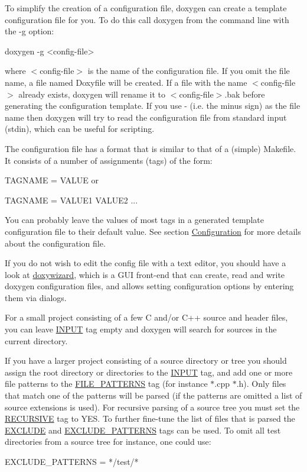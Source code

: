 To simplify the creation of a configuration file, doxygen can create a template configuration file for you. To do this call {\ttfamily doxygen} from the command line with the {\ttfamily -\/g} option: \begin{DoxyVerb}
doxygen -g <config-file>
\end{DoxyVerb}


where $<$config-\/file$>$ is the name of the configuration file. If you omit the file name, a file named {\ttfamily Doxyfile} will be created. If a file with the name $<$config-\/file$>$ already exists, doxygen will rename it to $<$config-\/file$>$.bak before generating the configuration template. If you use {\ttfamily -\/} (i.e. the minus sign) as the file name then doxygen will try to read the configuration file from standard input ({\ttfamily stdin}), which can be useful for scripting.

The configuration file has a format that is similar to that of a (simple) Makefile. It consists of a number of assignments (tags) of the form:

{\ttfamily TAGNAME = VALUE} or \par
 {\ttfamily TAGNAME = VALUE1 VALUE2 ... }\par


You can probably leave the values of most tags in a generated template configuration file to their default value. See section \hyperlink{config}{Configuration} for more details about the configuration file.

If you do not wish to edit the config file with a text editor, you should have a look at \hyperlink{doxywizard_usage}{doxywizard}, which is a GUI front-\/end that can create, read and write doxygen configuration files, and allows setting configuration options by entering them via dialogs.

For a small project consisting of a few C and/or C++ source and header files, you can leave \hyperlink{config_cfg_input}{INPUT} tag empty and doxygen will search for sources in the current directory.

If you have a larger project consisting of a source directory or tree you should assign the root directory or directories to the \hyperlink{config_cfg_input}{INPUT} tag, and add one or more file patterns to the \hyperlink{config_cfg_file_patterns}{FILE\_\-PATTERNS} tag (for instance {\ttfamily $\ast$.cpp $\ast$.h}). Only files that match one of the patterns will be parsed (if the patterns are omitted a list of source extensions is used). For recursive parsing of a source tree you must set the \hyperlink{config_cfg_recursive}{RECURSIVE} tag to {\ttfamily YES}. To further fine-\/tune the list of files that is parsed the \hyperlink{config_cfg_exclude}{EXCLUDE} and \hyperlink{config_cfg_exclude_patterns}{EXCLUDE\_\-PATTERNS} tags can be used. To omit all {\ttfamily test} directories from a source tree for instance, one could use: \begin{DoxyVerb}EXCLUDE_PATTERNS = */test/* 
\end{DoxyVerb}


